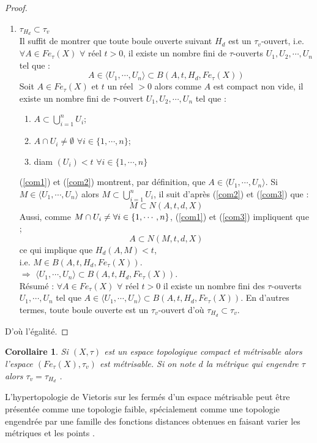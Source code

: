 \documentclass[11pt]{report}
\newenvironment{boxcorollaire}
{\begin{tcolorbox}
		[enhanced jigsaw,breakable,pad at break*=1mm,
		colback=black!5!white,boxrule=0pt,frame hidden,
		borderline east={1.5mm}{-2mm}{blue}]}
	{\end{tcolorbox}}
\theoremstyle{styletheorem}
\newtheorem{corollary}[theoreme]{Corollaire}
\theoremstyle{styledef}
\theoremstyle{remark}
\newenvironment{corollaire}{\begin{boxcorollaire}\begin{corollary}}{\end{corollary}\end{boxcorollaire}}
\begin{document}
\begin{proof}
\begin{enumerate}
			\item $\tau_{H_d} \subset \tau_v$\\ 
			Il suffit de montrer que toute boule ouverte suivant $H_d$ est un $\tau_v$-ouvert, i.e. $\forall A \in Fe_\tau (X) $ $ \forall $ réel $t > 0$, il existe un nombre fini de $\tau$-ouverts $U_1, U_2,\cdots, U_n$ tel que : $$A \in \langle  U_1,\cdots, U_n \rangle \subset B(A, t, H_d, Fe_\tau (X))$$
			Soit $A \in  Fe_\tau (X)$ et $t$ un réel $> 0$ alors comme $A$ est compact non vide, il existe un nombre fini de $\tau$-ouvert $U_1, U_2,\cdots, U_n$ tel que : 
			\begin{enumerate}
				\item $A \subset \bigcup_{i=1}^{n} U_i$;\label{com1}
				\item $A \cap U_i \neq \emptyset$ $ \forall i \in \lbrace 1, \cdots, n \rbrace$;\label{com2}
				\item diam $(U_i) <  t $  $\forall i \in \lbrace 1, \cdots, n \rbrace$ \label{com3}
			\end{enumerate}
			(\ref{com1})  et (\ref{com2}) montrent, par définition, que $A \in \langle  U_1,\cdots, U_n \rangle$.
			Si $M \in \langle  U_1,\cdots, U_n \rangle$ alors $M \subset   \bigcup_{i=1}^{n} U_i$, il suit d'après  (\ref{com2}) et (\ref{com3}) que  : $$M \subset N(A, t, d, X)$$
			Aussi, comme $M \cap U_i \neq \empty  \forall i \in \lbrace 1, \cdots, n \rbrace$, (\ref{com1}) et (\ref{com3}) impliquent que ; $$A \subset N(M, t, d, X) $$
			ce qui implique  que $H_d (A,M) < t$, \\ i.e.  $M \in B(A, t, H_d, Fe_\tau (X))$.\\ $\Rightarrow$ $ \langle  U_1,\cdots, U_n \rangle \subset  B(A, t, H_d, Fe_\tau (X))$.\\
			Résumé : $\forall A \in Fe_\tau (X) $ $\forall $ réel $t > 0$ il existe un nombre fini des $\tau$-ouverts $U_1 ,\cdots, U_n$ tel que $A \in \langle  U_1,\cdots, U_n \rangle \subset B(A, t, H_d, Fe_\tau (X))$. En d'autres termes, toute  boule ouverte est un $\tau_v$-ouvert d'où $\tau_{H_d} \subset \tau_v$.
		\end{enumerate}
		D'où l'égalité.
	\end{proof}
	\begin{corollaire}
		Si $(X, \tau)$ est un espace topologique compact et  métrisable alors l'espace $(Fe_\tau (X), \tau_v)$ est métrisable. Si on note $d$ la métrique qui engendre $\tau$ alors $\tau_v = \tau_{H_d}$ \cite{b7}.
	\end{corollaire}
	L'hypertopologie de Vietoris sur les fermés d'un espace métrisable peut être présentée comme une topologie faible, spécialement comme une topologie engendrée par une famille des fonctions distances obtenues en faisant varier les métriques et les points \cite{b14}.
	
\end{document}
